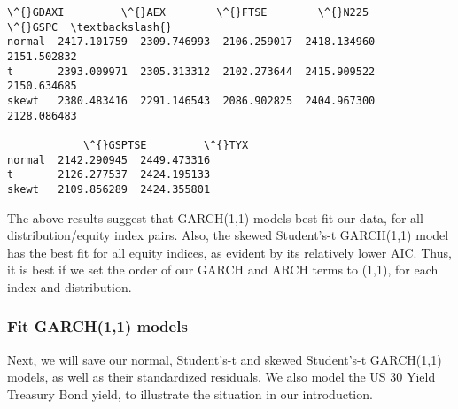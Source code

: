 \documentclass[11pt]{article}
\begin{document}
    \begin{Verbatim}[commandchars=\\\{\}]
             \^{}GDAXI         \^{}AEX        \^{}FTSE        \^{}N225        \^{}GSPC  \textbackslash{}
normal  2417.101759  2309.746993  2106.259017  2418.134960  2151.502832   
t       2393.009971  2305.313312  2102.273644  2415.909522  2150.634685   
skewt   2380.483416  2291.146543  2086.902825  2404.967300  2128.086483   

            \^{}GSPTSE         \^{}TYX  
normal  2142.290945  2449.473316  
t       2126.277537  2424.195133  
skewt   2109.856289  2424.355801  
    \end{Verbatim}

    
    The above results suggest that GARCH(1,1) models best fit our data, for
all distribution/equity index pairs. Also, the skewed Student's-t
GARCH(1,1) model has the best fit for all equity indices, as evident by
its relatively lower AIC. Thus, it is best if we set the order of our
GARCH and ARCH terms to (1,1), for each index and distribution.

    \subsubsection{Fit GARCH(1,1) models}\label{fit-garch11-models}

Next, we will save our normal, Student's-t and skewed Student's-t
GARCH(1,1) models, as well as their standardized residuals. We also
model the US 30 Yield Treasury Bond yield, to illustrate the situation
in our introduction.
\end{document}
